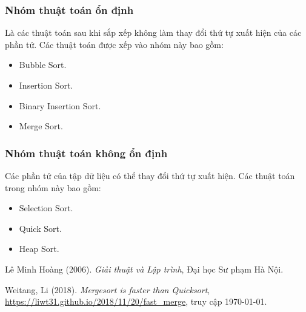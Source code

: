 \documentclass[]{article}
\begin{document}
\subsubsection{Nhóm thuật toán ổn định}
Là các thuật toán sau khi sắp xếp không làm thay đổi thứ tự xuất hiện của các phần tử. Các thuật toán được xếp vào nhóm này bao gồm:
\begin{itemize}
\item Bubble Sort.
\item Insertion Sort.
\item Binary Insertion Sort.
\item Merge Sort.
\end{itemize}

\subsubsection{Nhóm thuật toán không ổn định}
Các phần tử của tập dữ liệu có thể thay đổi thứ tự xuất hiện. Các thuật toán trong nhóm này bao gồm:
\begin{itemize}
\item Selection Sort.
\item Quick Sort.
\item Heap Sort.
\end{itemize}

\medskip

\begin{thebibliography}{10}
Lê Minh Hoàng (2006).
\textit{Giải thuật và Lập trình}, Đại học Sư phạm Hà Nội.

Weitang, Li (2018).
\textit{Mergesort is faster than Quicksort},
\url{https://liwt31.github.io/2018/11/20/fast_merge},
truy cập \today.
\end{thebibliography}
\end{document}
